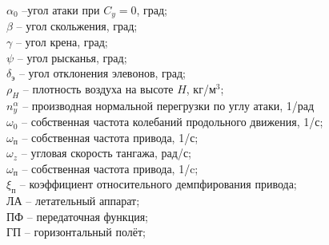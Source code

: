 $\alpha_0$ --угол атаки при $C_y = 0$, град;\\
$\beta$ -- угол скольжения, град; \\
$\gamma$ -- угол крена, град;\\
$\psi$ -- угол рысканья, град;\\ 
$\delta_\text{э}$ -- угол отклонения элевонов, град;\\
$\rho_H$ -- плотность воздуха на высоте $H$, кг/м$^3$;\\
$n_y^\alpha$ – производная нормальной перегрузки по углу атаки, 1/рад \\
$\omega_0$ -- собственная частота колебаний продольного движения, 1/с; \\ 
$\omega_\text{п}$ -- собственная частота привода, 1/с; \\ 
$\omega_z$ -- угловая скорость тангажа, рад/с; \\ 
$\omega_\text{п}$ -- собственная частота привода, 1/c; \\
$\xi_\text{п}$ -- коэффициент относительного демпфирования привода; \\
ЛА -- летательный аппарат; \\ 
ПФ -- передаточная функция; \\ 
ГП -- горизонтальный полёт; \\
